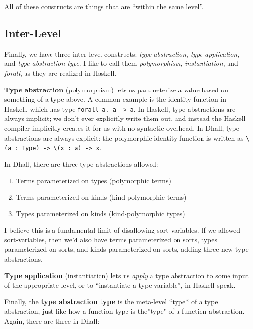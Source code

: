 \documentclass[]{article}
\begin{document}
All of these constructs are things that are ``within the same level''.

\hypertarget{inter-level}{%
\subsection{Inter-Level}\label{inter-level}}

Finally, we have three inter-level constructs: \emph{type abstraction},
\emph{type application}, and \emph{type abstraction type}. I like to call them
\emph{polymorphism}, \emph{instantiation}, and \emph{forall}, as they are
realized in Haskell.

\textbf{Type abstraction} (polymorphism) lets us parameterize a value based on
something of a type above. A common example is the identity function in Haskell,
which has type \texttt{forall\ a.\ a\ -\textgreater{}\ a}. In Haskell, type
abstractions are always implicit; we don't ever explicitly write them out, and
instead the Haskell compiler implicitly creates it for us with no syntactic
overhead. In Dhall, type abstractions are always explicit: the polymorphic
identity function is written as
\texttt{\textbackslash{}(a\ :\ Type)\ -\textgreater{}\ \textbackslash{}(x\ :\ a)\ -\textgreater{}\ x}.

In Dhall, there are three type abstractions allowed:

\begin{enumerate}
\def\labelenumi{\arabic{enumi}.}
\tightlist
\item
  Terms parameterized on types (polymorphic terms)
\item
  Terms parameterized on kinds (kind-polymorphic terms)
\item
  Types parameterized on kinds (kind-polymorphic types)
\end{enumerate}

I believe this is a fundamental limit of disallowing sort variables. If we
allowed sort-variables, then we'd also have terms parameterized on sorts, types
parameterized on sorts, and kinds parameterized on sorts, adding three new type
abstractions.

\textbf{Type application} (instantiation) lets us \emph{apply} a type
abstraction to some input of the appropriate level, or to ``instantiate a type
variable'', in Haskell-speak.

Finally, the \textbf{type abstraction type} is the meta-level ``type* of a type
abstraction, just like how a function type is the''type" of a function
abstraction. Again, there are three in Dhall:
\end{document}
